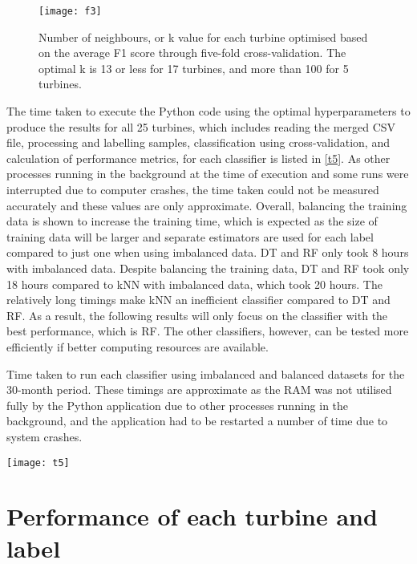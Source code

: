 \begin{figure}
  \centering
  \texttt{[image: f3]}
  \caption{\label{f3}Number of neighbours, or k value for each turbine optimised based on the average F1 score through five-fold cross-validation. The optimal k is 13 or less for 17 turbines, and more than 100 for 5 turbines.}
\end{figure}

The time taken to execute the Python code using the optimal hyperparameters to produce the results for all 25 turbines, which includes reading the merged CSV file, processing and labelling samples, classification using cross-validation, and calculation of performance metrics, for each classifier is listed in \autoref{t5}. As other processes running in the background at the time of execution and some runs were interrupted due to computer crashes, the time taken could not be measured accurately and these values are only approximate. Overall, balancing the training data is shown to increase the training time, which is expected as the size of training data will be larger and separate estimators are used for each label compared to just one when using imbalanced data. DT and RF only took 8 hours with imbalanced data. Despite balancing the training data, DT and RF took only 18 hours compared to kNN with imbalanced data, which took 20 hours. The relatively long timings make kNN an inefficient classifier compared to DT and RF. As a result, the following results will only focus on the classifier with the best performance, which is RF. The other classifiers, however, can be tested more efficiently if better computing resources are available.

\begin{table}
  \centering
  \caption{\label{t5}Time taken to run each classifier using imbalanced and balanced datasets for the 30-month period. These timings are approximate as the RAM was not utilised fully by the Python application due to other processes running in the background, and the application had to be restarted a number of time due to system crashes.}
  \texttt{[image: t5]}
\end{table}

\section{Performance of each turbine and label}


